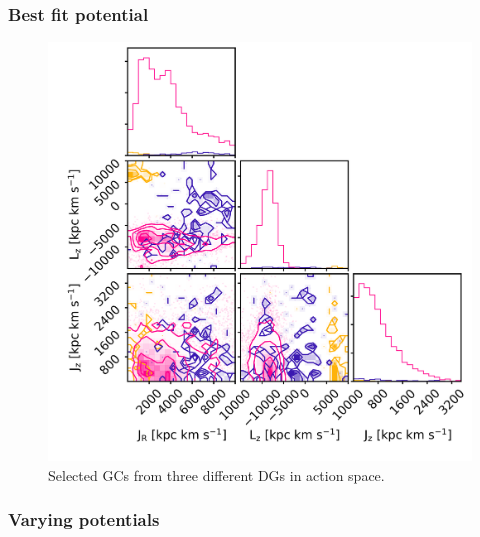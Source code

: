 \subsubsection{Best fit potential}
\begin{figure}[htbp]
    \centering
    \includegraphics[width=1.0\textwidth]{plots/Dynamics/prog234_actions_snap_127.png}
    \caption{Selected \acp{GC} from three different \acp{DG} in action space.}
    \label{fig:act_both_merg_best_pot}
\end{figure}



\subsubsection{Varying potentials}

